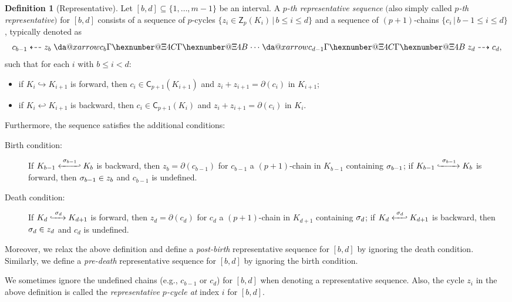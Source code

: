 \documentclass[letterpaper,11pt]{article}
\makeatletter
\theoremstyle{mythmstyle}
\theoremstyle{mydefstyle}
\newtheorem{definition}{Definition}
\theoremstyle{plain}
\theoremstyle{definition}
\newtheorem{definition}[theorem]{Definition}
\newcommand{\Chn}{\mathsf{C}}
\newcommand{\Cyc}{\mathsf{Z}}
\newcommand{\<}[1]{\langle #1\rangle}
\newcommand{\lbarrowspace}{\;}
\newcommand{\incto}{\hookrightarrow}
\newcommand{\inctosp}[1]{\xhookrightarrow{\lbarrowspace#1\lbarrowspace}}
\newcommand{\bakincto}{\hookleftarrow}
\newcommand{\bakinctosp}[1]{\xhookleftarrow{\lbarrowspace#1\lbarrowspace}}
\newcommand{\given}{\,|\,}
\newcommand{\Set}[1]{\{#1\}}
\newcommand{\Dim}{p}
\newcommand{\filtcnt}{m}
\newcommand{\cyc}{z}
\newcommand{\chn}{c}
\newcommand{\fsimp}[2]{\sigma_{#2}}
\newcommand*{\da@rightarrow}{\mathchar"0\hexnumber@\symAMSa 4B }
\newcommand*{\da@leftarrow}{\mathchar"0\hexnumber@\symAMSa 4C }
\newcommand{\xdashleftrightarrow}[2][]{%
  \mathrel{%
    \mathpalette{\da@xarrow{#1}{#2}\da@leftarrow\da@rightarrow{}{}}{}%
  }%
}
\newcommand*{\da@xarrow}[7]{%
  \sbox0{$\ifx#7\scriptstyle\scriptscriptstyle\else\scriptstyle\fi#5#1#6\m@th$}%
  \sbox2{$\ifx#7\scriptstyle\scriptscriptstyle\else\scriptstyle\fi#5#2#6\m@th$}%
  \sbox4{$#7\dabar@\m@th$}%
  \dimen@=\wd0 %
  \ifdim\wd2 >\dimen@
    \dimen@=\wd2 %
  \fi
  \count@=2 %
  \def\da@bars{\dabar@\dabar@}%
  \@whiledim\count@\wd4<\dimen@\do{%
    \advance\count@\@ne
    \expandafter\def\expandafter\da@bars\expandafter{%
      \da@bars
      \dabar@ 
    }%
  }%
  \mathrel{#3}%
  \mathrel{%
    \mathop{\da@bars}\limits
    \ifx\\#1\\%
    \else
      _{\copy0}%
    \fi
    \ifx\\#2\\%
    \else
      ^{\copy2}%
    \fi
  }%
  \mathrel{#4}%
  \!\!
}
\let\rseqlrarr\xdashleftrightarrow
\newcommand{\defemph}[1]{{\textit{#1}}}
\makeatother
\begin{document}
\begin{definition}[Representative]
\label{dfn:rep-seq}
Let $[b,d]\subseteq\Set{1,\ldots,\filtcnt-1}$ be an interval.
A \defemph{$\Dim$-th representative sequence} 
$($also simply called \defemph{$\Dim$-th representative}$)$
for $[b,d]$ consists of a sequence of $\Dim$-cycles
$\Set{\cyc_i\in \Cyc_\Dim(K_i)\given b\leq i\leq d}$
and a sequence of $(\Dim+1)$-chains
$\Set{\chn_i\given b-1\leq i\leq d}$,
typically denoted as
\[\chn_{b-1}\dashleftarrow\cyc_{b}\rseqlrarr{\chn_{b}}\cdots
\rseqlrarr{\chn_{d-1}}\cyc_{d}\dashrightarrow\chn_{d},\]
such that for each $i$ with $b\leq i<d$:
\begin{itemize}
    \item if $K_i\incto K_{i+1}$ is forward, then $\chn_i\in\Chn_{\Dim+1}(K_{i+1})$
    and $\cyc_i+\cyc_{i+1}=\partial(\chn_i)$ in $K_{i+1}$;
    \item if $K_i\bakincto K_{i+1}$ is backward, then $\chn_i\in\Chn_{\Dim+1}(K_{i})$
    and $\cyc_i+\cyc_{i+1}=\partial(\chn_i)$ in $K_{i}$.
\end{itemize}
Furthermore, the sequence 
satisfies the additional conditions:
\begin{description}
    \item[Birth condition:] \label{itm:dfn-rep-birth}
    If $K_{b-1}\bakinctosp{\fsimp_{b-1}} K_{b}$ is backward,
    then $\cyc_b=\partial(\chn_{b-1})$ 
    for $\chn_{b-1}$ a $(\Dim+1)$-chain in $K_{b-1}$ containing
    $\fsimp_{b-1}$;
    if $K_{b-1}\inctosp{\fsimp_{b-1}} K_{b}$ is forward,
    then $\fsimp_{b-1}\in\cyc_b$
    and $\chn_{b-1}$ is undefined.
    
    \item[Death condition:] \label{itm:dfn-rep-death}
    If $K_{d}\inctosp{\fsimp_{d}} K_{d+1}$ is forward,
    then $\cyc_d=\partial(\chn_{d})$ 
    for $\chn_{d}$ a $(\Dim+1)$-chain in $K_{d+1}$ containing
    $\fsimp_{d}$;
    if $K_{d}\bakinctosp{\fsimp_{d}} K_{d+1}$ is backward,
    then $\fsimp_{d}\in\cyc_d$
    and $\chn_{d}$ is undefined.
\end{description}
Moreover, 
we relax the above definition and define a \defemph{post-birth} 
representative sequence for $[b,d]$ by ignoring the death condition.
Similarly, we define a \defemph{pre-death} 
representative sequence for $[b,d]$ by ignoring the birth condition.
\end{definition}
We sometimes ignore the undefined chains 
(e.g., $\chn_{b-1}$ or $\chn_{d}$) for $[b,d]$ when denoting
a representative sequence.
Also, the cycle $z_i$ in the above definition is
called the {\it representative $\Dim$-cycle at} index $i$
for $[b,d]$.
\end{document}
